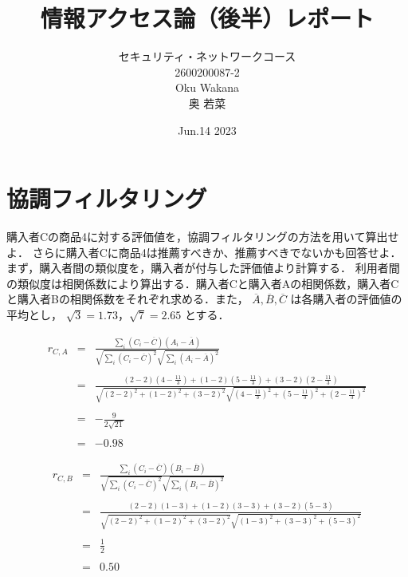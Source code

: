 \documentclass[dvipdfmx,autodetect-engine,titlepage]{jsarticle}
\title{情報アクセス論（後半）レポート\\
}
\author{セキュリティ・ネットワークコース\\2600200087-2\\Oku Wakana\\奥 若菜}
\date{Jun.14 2023}
\begin{document}
\maketitle

\section{協調フィルタリング}
購入者Cの商品4に対する評価値を，協調フィルタリングの方法を用いて算出せよ．
さらに購入者Cに商品4は推薦すべきか、推薦すべきでないかも回答せよ．\\

まず，購入者間の類似度を，購入者が付与した評価値より計算する．
利用者間の類似度は相関係数により算出する．購入者Cと購入者Aの相関係数，購入者Cと購入者Bの相関係数をそれぞれ求める．また，
\begin{math}
  \overline{A}, \overline{B}, \overline{C}
\end{math}
は各購入者の評価値の平均とし，
\begin{math}
  \sqrt{3} = 1.73， \sqrt{7} = 2.65 
\end{math}
とする．

\begin{eqnarray*}
  r_{C,A} &=& \frac{\sum_{i} (C_{i} - \overline{C})(A_{i} - \overline{A}) }{\sqrt{\sum_{i} (C_{i} - \overline{C})^2} \sqrt{\sum_{i} (A_{i} - \overline{A})^2}} \\\\
  &=& \frac{(2-2)(4-\frac{11}{3} ) + (1-2)(5-\frac{11}{3} ) + (3-2)(2-\frac{11}{3} )}{\sqrt{(2-2)^2+(1-2)^2+(3-2)^2} \sqrt{(4-\frac{11}{3} )^2+ (5-\frac{11}{3} )^2 + (2-\frac{11}{3} )^2}} \\\\
  &=& - \frac{9}{2\sqrt{21}  } \\\\
  &=& -0.98
\end{eqnarray*}

\begin{eqnarray*}
  r_{C,B} &=& \frac{\sum_{i} (C_{i} - \overline{C})(B_{i} - \overline{B}) }{\sqrt{\sum_{i} (C_{i} - \overline{C})^2} \sqrt{\sum_{i} (B_{i} - \overline{B})^2}} \\\\
  &=& \frac{(2-2)(1-3) + (1-2)(3-3) + (3-2)(5-3)}{\sqrt{(2-2)^2+(1-2)^2+(3-2)^2} \sqrt{(1-3)^2+ (3-3)^2 + (5-3)^2}} \\\\
  &=&  \frac{1}{2} \\\\
  &=& 0.50 \\
\end{eqnarray*}
\end{document}
